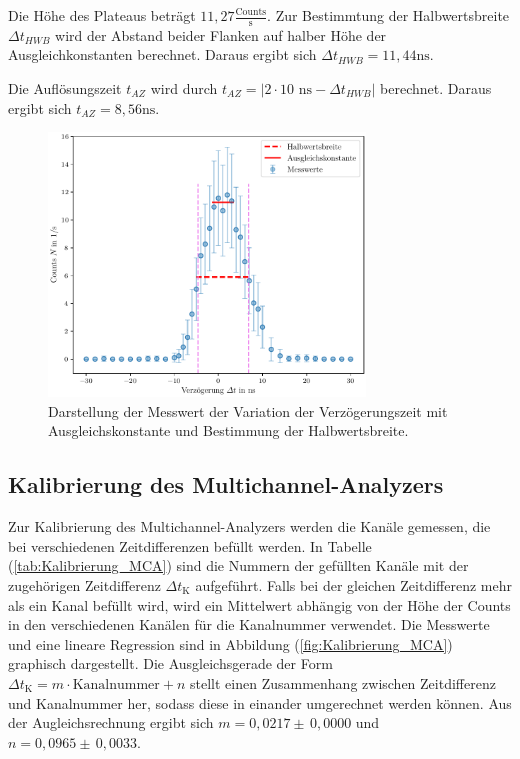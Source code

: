 Die Höhe des Plateaus beträgt $11,27 \frac{\text{Counts}}{\unit{\second}}$.
Zur Bestimmtung der Halbwertsbreite $\Delta t_{HWB}$ wird der Abstand 
beider Flanken auf halber Höhe der Ausgleichkonstanten berechnet.
Daraus ergibt sich $\Delta t_{HWB} = 11,44 \unit{\nano\second}$. 

Die Auflösungszeit $t_{AZ}$ wird durch  
$t_{AZ} = |2 \cdot 10 \,\, \unit{\nano\second}-\Delta t_{HWB}|$ berechnet.
Daraus ergibt sich $t_{AZ} = 8,56 \unit{\nano\second}$.

\begin{figure}
  \centering
  \includegraphics[width=0.75\textwidth]{Verzoegerung.pdf}
  \caption{Darstellung der Messwert der Variation der Verzögerungszeit mit Ausgleichskonstante und Bestimmung der Halbwertsbreite.}
  \label{fig:Verzoegerung}
\end{figure}
\FloatBarrier

\subsection{Kalibrierung des Multichannel-Analyzers}

Zur Kalibrierung des Multichannel-Analyzers werden die Kanäle 
gemessen, die bei verschiedenen Zeitdifferenzen befüllt werden. 
In Tabelle (\ref{tab:Kalibrierung_MCA}) sind die Nummern der
 gefüllten Kanäle mit der zugehörigen Zeitdifferenz 
 $\Delta t_{\text{K}}$ aufgeführt. Falls bei der gleichen Zeitdifferenz 
 mehr als ein Kanal befüllt wird, wird ein Mittelwert abhängig 
 von der Höhe der Counts in den verschiedenen Kanälen für 
 die Kanalnummer verwendet. Die Messwerte und eine lineare Regression 
 sind in Abbildung (\ref{fig:Kalibrierung_MCA}) graphisch dargestellt. 
 Die Ausgleichsgerade der Form $\Delta t_{\text{K}} = m \cdot \text{Kanalnummer} + n$
 stellt einen Zusammenhang zwischen Zeitdifferenz und Kanalnummer her, 
 sodass diese in einander umgerechnet werden können. 
 Aus der Augleichsrechnung ergibt sich $m = 0,0217 \pm \, 0,0000$ und $n = 0,0965 \pm \, 0,0033 $. 



